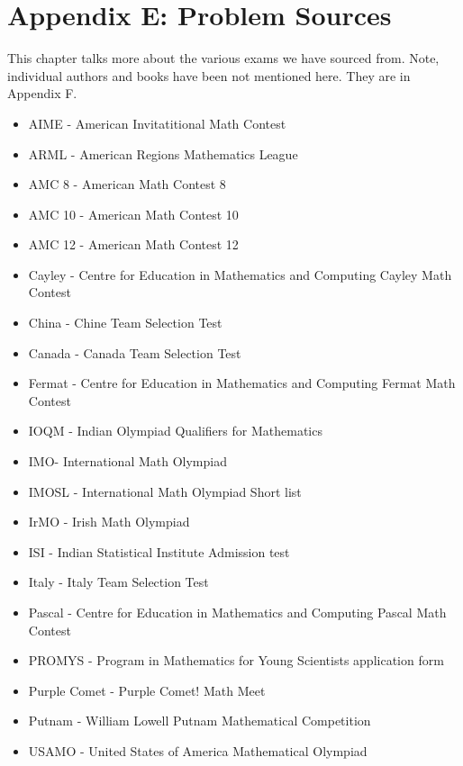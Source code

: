 \chapter{Appendix E: Problem Sources}
This chapter talks more about the various exams we have  sourced from. Note, individual authors and books have been not mentioned here. They are in Appendix F.\\
\begin{itemize}
    \item AIME - American Invitatitional Math Contest
    \item ARML - American Regions Mathematics League
    \item AMC 8 - American Math Contest 8
    \item AMC 10 - American Math Contest 10
    \item AMC 12 - American Math Contest 12
    \item Cayley - Centre for Education in Mathematics and Computing Cayley Math Contest
    \item China - Chine Team Selection Test
    \item Canada - Canada Team Selection Test
    \item Fermat - Centre for Education in Mathematics and Computing Fermat Math Contest
    \item IOQM - Indian Olympiad Qualifiers for Mathematics
    \item IMO- International Math Olympiad
    \item IMOSL - International Math Olympiad Short list
    \item IrMO - Irish Math Olympiad
    \item ISI - Indian Statistical Institute Admission test
    \item Italy - Italy Team Selection Test
    \item Pascal - Centre for Education in Mathematics and Computing Pascal Math Contest
    \item PROMYS - Program in Mathematics for Young Scientists application form
    \item Purple Comet - Purple Comet! Math Meet
    \item Putnam - William Lowell Putnam Mathematical Competition
    \item USAMO - United States of America Mathematical Olympiad
\end{itemize}